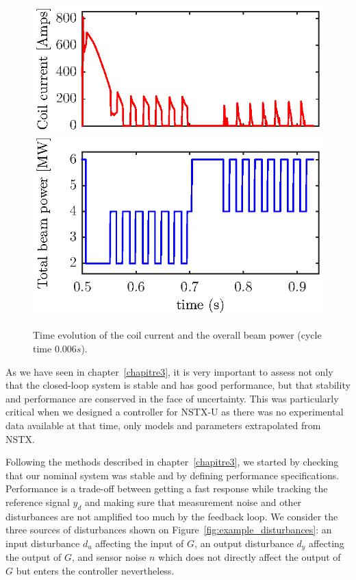 \documentclass[12pt,lot, lof]{puthesis}
\begin{document}
\begin{figure}[htbp]
	\centering
	\includegraphics[width=0.7 \linewidth]{fig19a}  \\[-0.5em]
	\includegraphics[width=0.7 \linewidth]{fig19b} 
	\caption{Time evolution of the coil current and the overall beam power (cycle time $0.006 s$). }
	\label{res2}
\end{figure}

As we have seen in chapter~\ref{chapitre3}, it is very important to assess not only that the closed-loop system is stable and has good performance, but that stability and performance are conserved in the face of uncertainty.
This was particularly critical when we designed a controller for NSTX-U as there was no experimental data available at that time, only models and parameters extrapolated from NSTX.

Following the methods described in chapter~\ref{chapitre3}, we started by checking that our nominal system was stable and by defining performance specifications.
Performance is a trade-off between getting a fast response while tracking the reference signal $y_d$ and making sure that measurement noise and other disturbances are not amplified too much by the feedback loop.
We consider the three sources of disturbances shown on Figure~\ref{fig:example_disturbances}: an input disturbance $d_u$ affecting the input of $G$, an output disturbance $d_y$ affecting the output of $G$, and sensor noise $n$ which does not directly affect the output of $G$ but enters the controller nevertheless.
\end{document}
